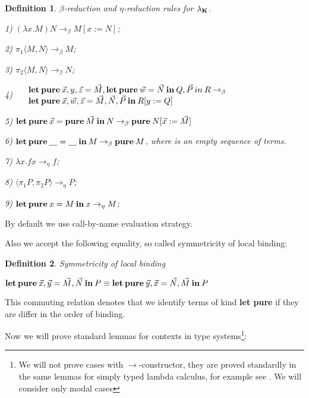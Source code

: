 \documentclass[a4paper]{article}
\newtheorem{defin}{Definition}
\begin{document}
  \begin{defin} $\beta$-reduction and $\eta$-reduction rules for $\lambda_{{\bf K}}$.

  1) $(\lambda x. M) N \rightarrow_{\beta} M [x := N]$;

  2) $\pi_1 \langle M, N \rangle \rightarrow_{\beta} M$;

  3) $\pi_2 \langle M, N \rangle \rightarrow_{\beta} N$;

  4) $\begin{array}{llll}
  & {\bf let \: pure \:} \vec{x}, y, \vec{z} = \vec{M}, {\bf let \: pure \: } \vec{w} = \vec{N} {\: \bf in \: } Q, \vec{P} {\: in \:} R \rightarrow_{\beta} & \\
  & {\bf let \: pure \:} \vec{x}, \vec{w}, \vec{z} = \vec{M}, \vec{N}, \vec{P} {\: \bf in \: } R [y := Q]
  \end{array}$

  5) ${\bf let \: pure \:} \vec{x} = {\bf pure \:} \vec{M} {\: \bf in \:} N \rightarrow_{\beta} {\bf pure \:} N [\vec{x} := \vec{M}]$

  6) ${\bf let \: pure \:} \underline{\quad} = \underline{\quad} {\: \bf in \:} M \rightarrow_{\beta} {\bf pure \:} M$, where \underline{\quad} is an empty sequence of terms.

  7) $\lambda x. f x \rightarrow_{\eta} f$;

  8) $\langle \pi_1 P, \pi_2 P \rangle \rightarrow_{\eta} P$;

  9) ${\bf let \: pure \:} x = M {\: \bf in \: } x \rightarrow_{\eta} M$;

  \end{defin}

By default we use call-by-name evaluation strategy.

Also we accept the following equality, so called symmetricity of local binding:

\begin{defin} Symmetricity of local binding

  ${\bf let \: pure \:} \vec{x}, \vec{y} = \vec{M}, \vec{N} {\: \bf in \:} P \equiv {\bf let \: pure \:} \vec{y}, \vec{x} = \vec{N}, \vec{M} {\: \bf in \:} P$

\end{defin}

This commuting relation denotes that we identify terms of kind {\bf let pure} if they are differ in the order of binding.

Now we will prove standard lemmas for contexts in type systems\footnote{We will not prove cases with
$\to$-constructor, they are proved standardly in the same lemmas for simply typed lambda calculus, for
example see \cite{Neder} \cite{Morten}. We will consider only modal cases}:
\end{document}
